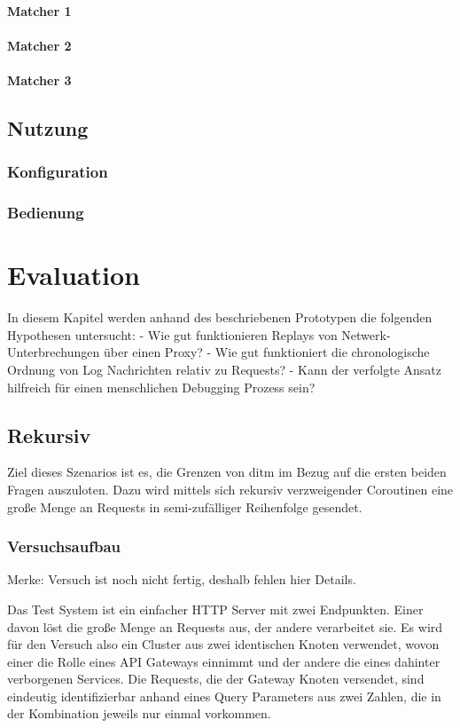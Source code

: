 \documentclass[a4paper]{report}
\begin{document}
\subsubsection{Matcher 1}
\subsubsection{Matcher 2}
\subsubsection{Matcher 3}

\section{Nutzung}
\subsection{Konfiguration}
\subsection{Bedienung}

\chapter{Evaluation}
In diesem Kapitel werden anhand des beschriebenen Prototypen die folgenden Hypothesen untersucht:
- Wie gut funktionieren Replays von Netwerk-Unterbrechungen über einen Proxy?
- Wie gut funktioniert die chronologische Ordnung von Log Nachrichten relativ zu Requests?
- Kann der verfolgte Ansatz hilfreich für einen menschlichen Debugging Prozess sein?
\section{Rekursiv}
Ziel dieses Szenarios ist es, die Grenzen von ditm im Bezug auf die ersten beiden Fragen auszuloten.
Dazu wird mittels sich rekursiv verzweigender Coroutinen eine große Menge an Requests in semi-zufälliger
Reihenfolge gesendet.
\subsection{Versuchsaufbau}
Merke: Versuch ist noch nicht fertig, deshalb fehlen hier Details.

Das Test System ist ein einfacher HTTP Server mit zwei Endpunkten. Einer davon löst die große Menge an
Requests aus, der andere verarbeitet sie. Es wird für den Versuch also ein Cluster aus zwei identischen
Knoten verwendet, wovon einer die Rolle eines API Gateways einnimmt und der andere die eines dahinter
verborgenen Services.
Die Requests, die der Gateway Knoten versendet, sind eindeutig identifizierbar anhand eines Query Parameters
aus zwei Zahlen, die in der Kombination jeweils nur einmal vorkommen.
\end{document}
